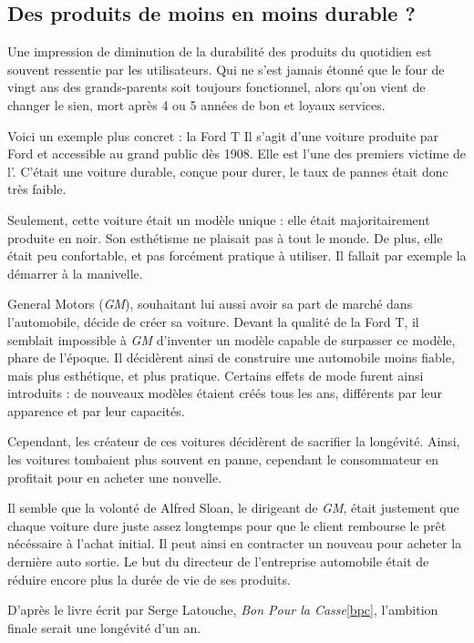 \subsection{Des produits de moins en moins durable ?}

Une impression de diminution de la durabilité des produits du quotidien est souvent ressentie par les utilisateurs.  Qui ne s'est jamais étonné que le four de vingt ans des grands-parents soit toujours fonctionnel, alors qu'on vient de changer le sien, mort après 4 ou 5 années de bon et loyaux services. 

\smallbreak
Voici un exemple plus concret : la Ford T
Il s'agit d'une voiture produite par Ford et accessible au grand public dès 1908.
Elle est l'une des premiers victime de l'\op.
C'était une voiture durable, conçue pour durer, le taux de pannes était donc très faible.   

Seulement, cette voiture était un modèle unique : elle était majoritairement produite en noir. Son esthétisme ne plaisait pas à tout le monde. De plus, elle était peu confortable, et pas forcément pratique à utiliser. Il fallait par exemple la démarrer à la manivelle. 

General Motors (\textit{GM}), souhaitant lui aussi avoir sa part de marché dans l'automobile, décide de créer sa voiture.
Devant la qualité de la Ford T, il semblait impossible à \textit{GM} d'inventer un modèle capable de surpasser ce modèle, phare de l'époque.
Il décidèrent ainsi de construire une automobile moins fiable, mais plus esthétique, et plus pratique.
Certains effets de mode furent ainsi introduits : de nouveaux modèles étaient créés tous les ans, différents par leur apparence et par leur capacités.

Cependant, les créateur de ces voitures décidèrent de sacrifier la longévité. Ainsi, les voitures tombaient plus souvent en panne, cependant le consommateur en profitait pour en acheter une nouvelle.

Il semble que la volonté de Alfred Sloan, le dirigeant de \textit{GM}, était justement que chaque voiture dure juste assez longtemps pour que le client rembourse le prêt nécéssaire à l'achat initial.
Il peut ainsi en contracter un nouveau pour acheter la dernière auto sortie. Le but du directeur de l'entreprise automobile était de réduire encore plus la durée de vie de ses produits.

D'après le livre écrit par Serge Latouche, \textit{Bon Pour la Casse}\ref{bpc}, l'ambition finale serait une longévité d'un an.

